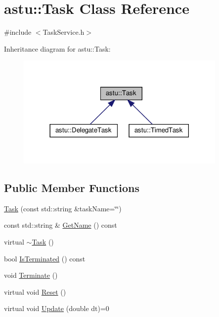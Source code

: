 \hypertarget{classastu_1_1Task}{}\section{astu\+:\+:Task Class Reference}
\label{classastu_1_1Task}


{\ttfamily \#include $<$Task\+Service.\+h$>$}



Inheritance diagram for astu\+:\+:Task\+:\nopagebreak
\begin{figure}[H]
\begin{center}
\leavevmode
\includegraphics[width=290pt]{classastu_1_1Task__inherit__graph}
\end{center}
\end{figure}
\subsection*{Public Member Functions}
\begin{DoxyCompactItemize}
\item 
\hyperlink{classastu_1_1Task_a32d5264221777690acdab94974aa2e15}{Task} (const std\+::string \&task\+Name=\char`\"{}\char`\"{})
\item 
const std\+::string \& \hyperlink{classastu_1_1Task_aa25f996b5c77b60166fe0c7e169b7c8c}{Get\+Name} () const
\item 
virtual \hyperlink{classastu_1_1Task_a69df74d5a4c65f313555134404b24f25}{$\sim$\+Task} ()
\item 
bool \hyperlink{classastu_1_1Task_a4fc46f40fb4f4b0d7bddb0a417a2be5f}{Is\+Terminated} () const
\item 
void \hyperlink{classastu_1_1Task_a6b9160915de23077b54db896943f413f}{Terminate} ()
\item 
virtual void \hyperlink{classastu_1_1Task_af68025df1de6ad31882f0ccee5ccb100}{Reset} ()
\item 
virtual void \hyperlink{classastu_1_1Task_a2bcec3cc42b46cfcb03422e029577c0a}{Update} (double dt)=0
\end{DoxyCompactItemize}
